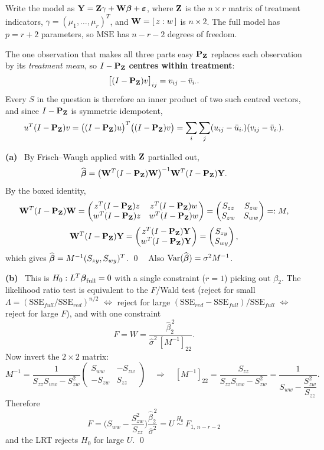 \documentclass[11pt]{article}
\newcommand{\wh}[1]{\widehat{#1}}
\newcommand{\Pj}{\mathbf{P}}
\newcommand{\SSE}{\mathrm{SSE}}
\newcommand{\MSE}{\mathrm{MSE}}
\newcommand{\pt}[1]{\smallskip\noindent\textbf{(#1)}\ }
\begin{document}
Write the model as $\mathbf{Y}=\mathbf{Z}\gamma+\mathbf{W}\boldsymbol{\beta}+\boldsymbol{\varepsilon}$, where $\mathbf{Z}$ is the $n\times r$ matrix of
treatment indicators, $\gamma=(\mu_1,\dots,\mu_r)^T$, and $\mathbf{W}=[\,z:w\,]$ is $n\times2$. The
full model has $p=r+2$ parameters, so $\MSE$ has $n-r-2$ degrees of freedom.

\begin{idea}{The one observation that makes all three parts easy}
$\Pj_\bZ$ replaces each observation by its \emph{treatment mean}, so $I-\Pj_\bZ$
\textbf{centres within treatment}:
\[
  \big[(I-\Pj_\bZ)v\big]_{ij}=v_{ij}-\bar v_{i\cdot}.
\]
Every $S$ in the question is therefore an inner product of two such centred vectors, and
since $I-\Pj_\bZ$ is symmetric idempotent,
\[
  u^T(I-\Pj_\bZ)v=\big((I-\Pj_\bZ)u\big)^T\big((I-\Pj_\bZ)v\big)
  =\sum_i\sum_j(u_{ij}-\bar u_{i\cdot})(v_{ij}-\bar v_{i\cdot}).
\]
\end{idea}

\pt{a} By Frisch--Waugh applied with $\mathbf{Z}$ partialled out,
\[
  \wh\bb=\big(\bW^T(I-\Pj_\bZ)\bW\big)^{-1}\bW^T(I-\Pj_\bZ)\bY .
\]
By the boxed identity,
\[
  \bW^T(I-\Pj_\bZ)\bW
  =\begin{pmatrix}z^T(I-\Pj_\bZ)z & z^T(I-\Pj_\bZ)w\\ w^T(I-\Pj_\bZ)z & w^T(I-\Pj_\bZ)w\end{pmatrix}
  =\begin{pmatrix}S_{zz}&S_{zw}\\S_{zw}&S_{ww}\end{pmatrix}=:M,
\]
\[
  \bW^T(I-\Pj_\bZ)\bY=\begin{pmatrix}z^T(I-\Pj_\bZ)\bY\\ w^T(I-\Pj_\bZ)\bY\end{pmatrix}
  =\begin{pmatrix}S_{zy}\\S_{wy}\end{pmatrix},
\]
which gives $\wh\bb=M^{-1}(S_{zy},S_{wy})^T$. \qed \ \ Also $\Var(\wh\bb)=\sigma^2M^{-1}$.

\pt{b} This is $H_0:L^T\boldsymbol{\beta}_{\text{full}}=0$ with a single constraint ($r=1$) picking out
$\beta_2$. The likelihood ratio test is equivalent to the $F$/Wald test (reject for small
$\Lambda=(\SSE_{full}/\SSE_{red})^{n/2}$ $\iff$ reject for large
$(\SSE_{red}-\SSE_{full})/\SSE_{full}$ $\iff$ reject for large $F$), and with one constraint
\[
  F=W=\frac{\wh\beta_2^{\,2}}{\wh\sigma^2\,[M^{-1}]_{22}} .
\]
Now invert the $2\times2$ matrix:
\[
  M^{-1}=\frac{1}{S_{zz}S_{ww}-S_{zw}^2}\begin{pmatrix}S_{ww}&-S_{zw}\\-S_{zw}&S_{zz}\end{pmatrix}
  \quad\Longrightarrow\quad
  [M^{-1}]_{22}=\frac{S_{zz}}{S_{zz}S_{ww}-S_{zw}^2}=\frac{1}{S_{ww}-\dfrac{S_{zw}^2}{S_{zz}}} .
\]
Therefore
\[
  \boxed{\ F=\Big(S_{ww}-\frac{S_{zw}^2}{S_{zz}}\Big)\frac{\wh\beta_2^{\,2}}{\wh\sigma^2}=U
  \ \overset{H_0}{\sim}\ F_{1,\,n-r-2}\ }
\]
and the LRT rejects $H_0$ for large $U$. \qed
\end{document}

